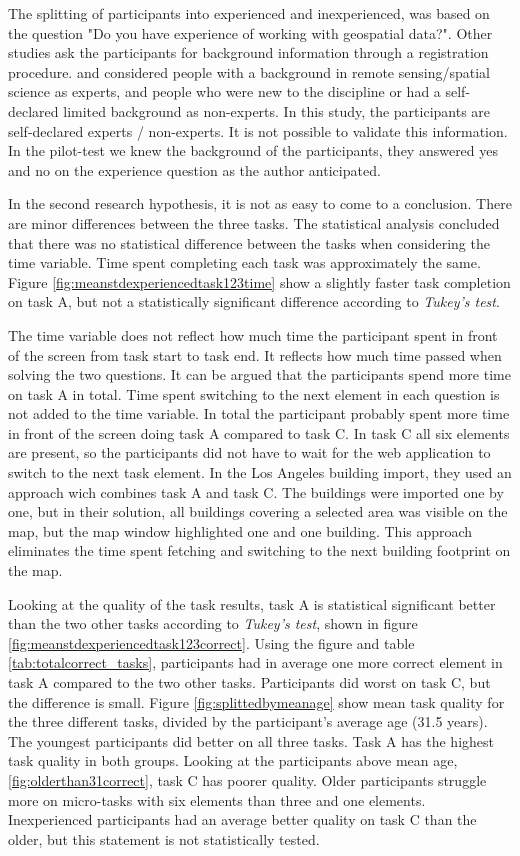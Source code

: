 The splitting of participants into experienced and inexperienced, was based on the question "Do you have experience of working with geospatial data?". Other studies ask the participants for background information through a registration procedure. \cite{See2013} and \cite{Salk2016} considered people with a background in remote sensing/spatial science as experts, and people who were new to the discipline or had a self-declared limited background as non-experts. In this study, the participants are self-declared experts / non-experts. It is not possible to validate this information. In the pilot-test we knew the background of the participants, they answered yes and no on the experience question as the author anticipated. 

In the second research hypothesis, it is not as easy to come to a conclusion. There are minor differences between the three tasks. The statistical analysis concluded that there was no statistical difference between the tasks when considering the time variable. Time spent completing each task was approximately the same. Figure \ref{fig:meanstdexperiencedtask123time} show a slightly faster task completion on task A, but not a statistically significant difference according to \textit{Tukey's test}. 

The time variable does not reflect how much time the participant spent in front of the screen from task start to task end. It reflects how much time passed when solving the two questions. It can be argued that the participants spend more time on task A in total. Time spent switching to the next element in each question is not added to the time variable. In total the participant probably spent more time in front of the screen doing task A compared to task C. In task C all six elements are present, so the participants did not have to wait for the web application to switch to the next task element. In the Los Angeles building import, they used an approach wich combines task A and task C. The buildings were imported one by one, but in their solution, all buildings covering a selected area was visible on the map, but the map window highlighted one and one building. This approach eliminates the time spent fetching and switching to the next building footprint on the map.  

Looking at the quality of the task results, task A is statistical significant better than the two other tasks according to \textit{Tukey's test}, shown in figure \ref{fig:meanstdexperiencedtask123correct}. Using the figure and table \ref{tab:totalcorrect_tasks}, participants had in average one more correct element in task A compared to the two other tasks. Participants did worst on task C, but the difference is small. Figure \ref{fig:splittedbymeanage} show mean task quality for the three different tasks, divided by the participant's average age (31.5 years). The youngest participants did better on all three tasks. Task A has the highest task quality in both groups. Looking at the participants above mean age, \ref{fig:olderthan31correct}, task C has poorer quality. Older participants struggle more on micro-tasks with six elements than three and one elements. Inexperienced participants had an average better quality on task C than the older, but this statement is not statistically tested. 

